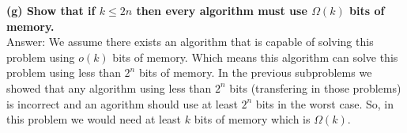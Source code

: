 \documentclass{article}
\begin{document}
\textbf{(g) Show that if $k\leq 2n$ then every algorithm must use $\Omega(k)$ bits of memory.} \\ \newline
Answer: We assume there exists an algorithm that is capable of solving this problem using $o(k)$ bits of memory. Which means this algorithm can solve this problem using less than $2^n$ bits of memory. In the previous subproblems we showed that any algorithm using less than $2^n$ bits (transfering in those problems) is incorrect and an agorithm should use at least $2^n$ bits in the worst case. So, in this problem we would need at least $k$ bits of memory which is $\Omega(k)$. \\ \newline
\end{document}
